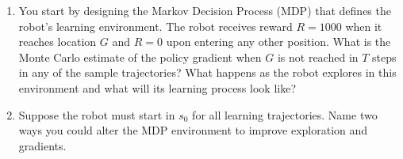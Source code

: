 \documentclass[11pt]{article}
\begin{document}
\begin{enumerate}[label=(\Alph*)]
    \item You start by designing the Markov Decision Process (MDP) that defines the robot's learning environment. The robot receives reward $R=1000$ when it reaches location $G$ and $R=0$ upon entering any other position. What is the Monte Carlo estimate of the policy gradient when $G$ is not reached in $T$ steps in any of the sample trajectories? What happens as the robot explores in this environment and what will its learning process look like?

    \item Suppose the robot must start in $s_0$ for all learning trajectories. Name two ways you could alter the MDP environment to improve exploration and gradients.
    

\end{enumerate}
\end{document}
